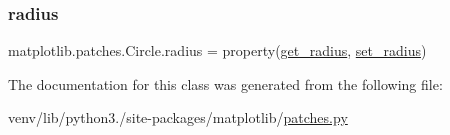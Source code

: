 \subsubsection{\texorpdfstring{radius}{radius}}
{\footnotesize\ttfamily matplotlib.\+patches.\+Circle.\+radius = property(\hyperlink{classmatplotlib_1_1patches_1_1Circle_aed6967429d1fda4963d28eb9a1360e5b}{get\+\_\+radius}, \hyperlink{classmatplotlib_1_1patches_1_1Circle_acbc80dd84cc7972c98628006d529dd25}{set\+\_\+radius})\hspace{0.3cm}{\ttfamily [static]}}



The documentation for this class was generated from the following file\+:\begin{DoxyCompactItemize}
\item 
venv/lib/python3./site-\/packages/matplotlib/\hyperlink{patches_8py}{patches.\+py}\end{DoxyCompactItemize}
